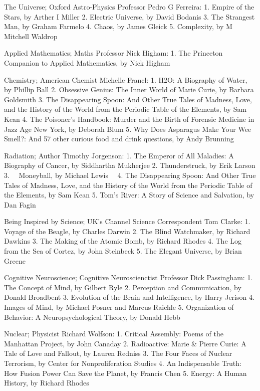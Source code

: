 The Universe;
Oxford Astro-Physics Professor Pedro G Ferreira:
1. Empire of the Stars, by Arther I Miller
2. Electric Universe, by David Bodanis
3. The Strangest Man, by Graham Farmelo
4. Chaos, by James Gleick
5. Complexity, by M Mitchell Waldrop

Applied Mathematics;
Maths Professor Nick Higham:
1. The Princeton Companion to Applied Mathematics, by Nick Higham

Chemistry;
American Chemist Michelle Francl:
1. H2O: A Biography of Water, by Phillip Ball
2. Obsessive Genius: The Inner World of Marie Curie, by Barbara Goldsmith
3. The Disappearing Spoon: And Other True Tales of Madness, Love, and the History of the World from the Periodic Table of the Elements, by Sam Kean
4. The Poisoner's Handbook: Murder and the Birth of Forensic Medicine in Jazz Age New York, by Deborah Blum
5. Why Does Asparagus Make Your Wee Smell?: And 57 other curious food and drink questions, by Andy Brunning

Radiation;
Author Timothy Jorgenson:
1. The Emperor of All Maladies: A Biography of Cancer, by Siddhartha Mukherjee
2. Thunderstruck, by Erik Larson
3. ~~Moneyball, by Michael Lewis~~
4. The Disappearing Spoon: And Other True Tales of Madness, Love, and the History of the World from the Periodic Table of the Elements, by Sam Kean
5. Tom's River: A Story of Science and Salvation, by Dan Fagin

Being Inspired by Science;
UK's Channel Science Correspondent Tom Clarke:
1. Voyage of the Beagle, by Charles Darwin
2. The Blind Watchmaker, by Richard Dawkins
3. The Making of the Atomic Bomb, by Richard Rhodes
4. The Log from the Sea of Cortez, by John Steinbeck
5. The Elegant Universe, by Brian Greene

Cognitive Neuroscience;
Cognitive Neuroscienctist Professor Dick Passingham:
1. The Concept of Mind, by Gilbert Ryle
2. Perception and Communication, by Donald Broadbent
3. Evolution of the Brain and Intelligence, by Harry Jerison
4. Images of Mind, by Michael Posner and Marcus Raichle
5. Organization of Behavior: A Neuropsychological Theory, by Donald Hebb

Nuclear;
Physicist Richard Wolfson:
1. Critical Assembly: Poems of the Manhattan Project, by John Canaday
2. Radioactive: Marie \& Pierre Curie: A Tale of Love and Fallout, by Lauren Redniss
3. The Four Faces of Nuclear Terrorism, by Center for Nonproliferation Studies
4. An Indispensable Truth: How Fusion Power Can Save the Planet, by Francis Chen
5. Energy: A Human History, by Richard Rhodes

